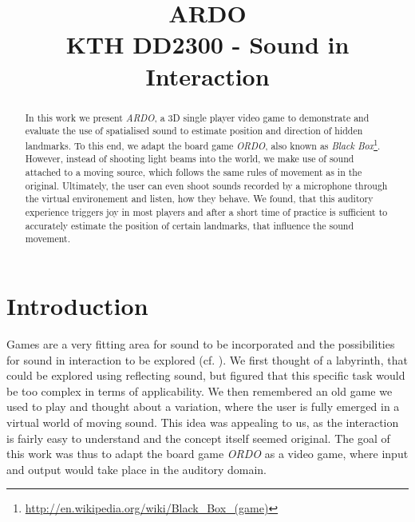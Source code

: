 \documentclass[conference]{IEEEtran}
\begin{document}
% 
\title{ARDO \\ {\LARGE KTH DD2300 - Sound in Interaction}}
\author{
    \and
}
\maketitle
% 
% 
\begin{abstract}
In this work we present \textit{ARDO}, a 3D single player video game to demonstrate and evaluate the use of spatialised sound to estimate position and direction of hidden landmarks. 
To this end, we adapt the board game \textit{ORDO}, also known as \textit{Black Box}\footnote{\url{http://en.wikipedia.org/wiki/Black_Box_(game)}}. 
However, instead of shooting light beams into the world, we make use of sound attached to a moving source, which follows the same rules of movement as in the original. 
Ultimately, the user can even shoot sounds recorded by a microphone through the virtual environement and listen, how they behave. 
We found, that this auditory experience triggers joy in most players and after a short time of practice is sufficient to accurately estimate the position of certain landmarks, that influence the sound movement.
\end{abstract}
% 
% 
\section{Introduction}
Games are a very fitting area for sound to be incorporated and the possibilities for sound in interaction to be explored (cf. \cite{Hermann06}). 
We first thought of a labyrinth, that could be explored using reflecting sound, but figured that this specific task would be too complex in terms of applicability. 
We then remembered an old game we used to play and thought about a variation, where the user is fully emerged in a virtual world of moving sound. 
This idea was appealing to us, as the interaction is fairly easy to understand and the concept itself seemed original. 
The goal of this work was thus to adapt the board game \textit{ORDO} as a video game, where input and output would take place in the auditory domain.
% 
% 
\end{document}
